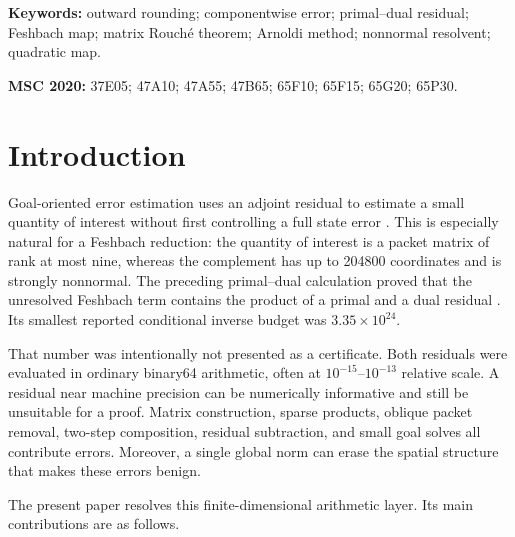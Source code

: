 \documentclass[11pt]{article}
\theoremstyle{definition}
\theoremstyle{remark}
\newcommand{\norm}[1]{\left\lVert#1\right\rVert}
\begin{document}
\begin{abstract}
These results certify outward residual and small-matrix budget calculations
for the stored finite factors, subject to the stated floating-point model.
They do not supply an upper bound for \(\norm{A_z^{-1}}_2\), validate contour
arcs, enclose construction error from the continuous Gaussian kernel, or
prove a root count for the continuous transfer operator.
\end{abstract}

\noindent\textbf{Keywords:} outward rounding; componentwise error;
primal--dual residual; Feshbach map; matrix Rouch\'e theorem; Arnoldi method;
nonnormal resolvent; quadratic map.

\medskip
\noindent\textbf{MSC 2020:} 37E05; 47A10; 47A55; 47B65; 65F10; 65F15;
65G20; 65P30.

\section{Introduction}
\label{sec:introduction}

Goal-oriented error estimation uses an adjoint residual to estimate a small
quantity of interest without first controlling a full state error
\citep{BeckerRannacher2001,GilesSuli2002}.  This is especially natural for
a Feshbach reduction: the quantity of interest is a packet matrix of rank at
most nine, whereas the complement has up to 204800 coordinates and is
strongly nonnormal.  The preceding primal--dual calculation proved that the
unresolved Feshbach term contains the product of a primal and a dual
residual \citep{WangPrimalDual2026}.  Its smallest reported conditional
inverse budget was \(3.35\times10^{24}\).

That number was intentionally not presented as a certificate.  Both
residuals were evaluated in ordinary binary64 arithmetic, often at
\(10^{-15}\)--\(10^{-13}\) relative scale.  A residual near machine
precision can be numerically informative and still be unsuitable for a
proof.  Matrix construction, sparse products, oblique packet removal,
two-step composition, residual subtraction, and small goal solves all
contribute errors.  Moreover, a single global norm can erase the spatial
structure that makes these errors benign.

The present paper resolves this finite-dimensional arithmetic layer.  Its
main contributions are as follows.
\end{document}
